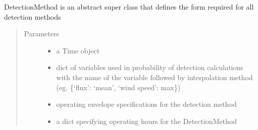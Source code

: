 \documentclass[letterpaper,10pt,english]{sphinxmanual}
\begin{document}
\begin{fulllineitems}
\label{\detokenize{index:feast.DetectionModules.abstract_detection_method.DetectionMethod}}
DetectionMethod is an abstract super class that defines the form required for all detection methods
\begin{quote}\begin{description}
\item[{Parameters}] \leavevmode\begin{itemize}
\item {} 
 \textendash{} a Time object

\item {} 
 \textendash{} dict of variables used in probability of detection calculations with the name of
the variable followed by interpolation method (eg. \{‘flux’: ‘mean’, ‘wind speed’: max\})

\item {} 
 \textendash{} operating envelope specifications for the detection method

\item {} 
 \textendash{} a dict specifying operating hours for the DetectionMethod

\end{itemize}

\end{description}\end{quote}


\end{fulllineitems}
\end{document}
